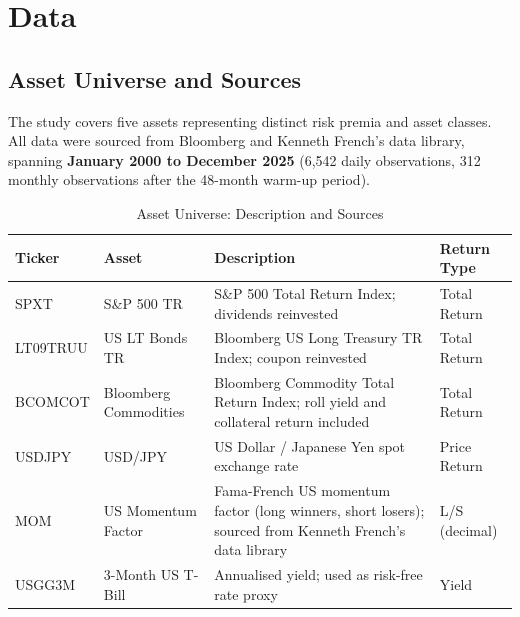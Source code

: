 \documentclass[12pt, a4paper]{article}
\begin{document}
\section{Data}
\label{sec:data}

\subsection{Asset Universe and Sources}

The study covers five assets representing distinct risk premia and asset classes. All data
were sourced from Bloomberg and Kenneth French's data library, spanning
\textbf{January 2000 to December 2025} (6,542 daily observations, 312 monthly
observations after the 48-month warm-up period).

\begin{table}[H]
  \centering
  \caption{Asset Universe: Description and Sources}
  \label{tab:data_desc}
  \small
  \begin{tabularx}{\textwidth}{llXl}
    \toprule
    \textbf{Ticker} & \textbf{Asset} & \textbf{Description} & \textbf{Return Type} \\
    \midrule
    SPXT     & S\&P 500 TR           & S\&P 500 Total Return Index; dividends reinvested
                                     & Total Return \\
    LT09TRUU & US LT Bonds TR        & Bloomberg US Long Treasury TR Index; coupon reinvested
                                     & Total Return \\
    BCOMCOT  & Bloomberg Commodities & Bloomberg Commodity Total Return Index; roll yield
                                       and collateral return included
                                     & Total Return \\
    USDJPY   & USD/JPY               & US Dollar / Japanese Yen spot exchange rate
                                     & Price Return \\
    MOM      & US Momentum Factor    & Fama-French US momentum factor (long winners, short
                                       losers); sourced from Kenneth French's data library
                                     & L/S (decimal) \\
    USGG3M   & 3-Month US T-Bill     & Annualised yield; used as risk-free rate proxy
                                     & Yield \\
    \bottomrule
  \end{tabularx}
\end{table}
\end{document}

